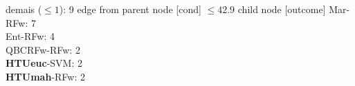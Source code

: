 {{{%
demais ($\leq 1$): 9} edge from parent node [cond] {$\leq42.9$}}
child {node [outcome] {
Mar-RFw: 7\\
Ent-RFw: 4\\
QBCRFw-RFw: 2\\
\textbf{HTUeuc}-SVM: 2\\
\textbf{HTUmah}-RFw: 2\\
}}}
